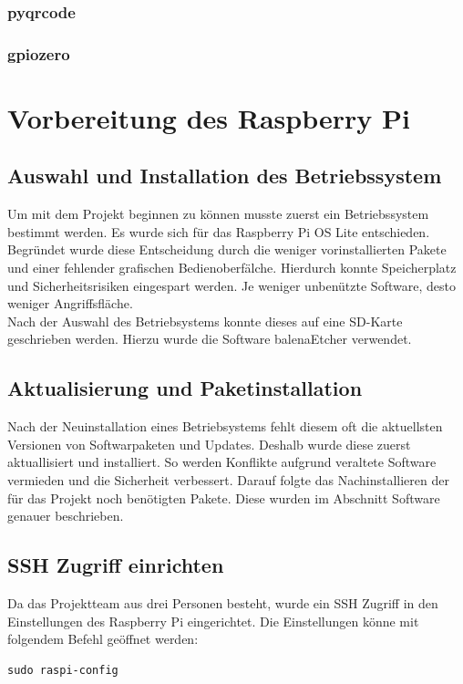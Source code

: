 \documentclass[a4paper,11pt,singlespacing]{article}
\begin{document}
    			\subsubsection{pyqrcode}
    			\subsubsection{gpiozero}
    	
    	
    	\section{Vorbereitung des Raspberry Pi}
    	\subsection{Auswahl und Installation des Betriebssystem}
    	    Um mit dem Projekt beginnen zu können musste zuerst ein Betriebssystem bestimmt werden.
        	Es wurde sich für das Raspberry Pi OS Lite entschieden. Begründet wurde diese Entscheidung  durch die weniger vorinstallierten Pakete und einer fehlender grafischen Bedienoberfälche. Hierdurch konnte Speicherplatz und Sicherheitsrisiken eingespart werden. Je weniger unbenützte Software, desto weniger Angriffsfläche. \\ 
    	
        	Nach der Auswahl des Betriebsystems konnte dieses auf eine SD-Karte geschrieben werden.
        	Hierzu wurde die Software balenaEtcher verwendet.   
    	
    	
    	\subsection{Aktualisierung und Paketinstallation}
        	Nach der Neuinstallation eines Betriebsystems fehlt diesem oft die aktuellsten Versionen von Softwarpaketen und Updates. Deshalb wurde diese zuerst aktuallisiert und installiert. So werden Konflikte aufgrund veraltete Software vermieden und die Sicherheit verbessert.  
        	Darauf folgte das Nachinstallieren der für das Projekt noch benötigten Pakete. Diese wurden im Abschnitt Software genauer beschrieben. 
    	
    	
    	\subsection{SSH Zugriff einrichten}
    	Da das Projektteam aus drei Personen besteht, wurde ein SSH Zugriff in den Einstellungen des Raspberry Pi eingerichtet. Die Einstellungen könne mit folgendem Befehl geöffnet werden: 
        \begin{lstlisting}
sudo raspi-config
        \end{lstlisting} 
    	
\end{document}
